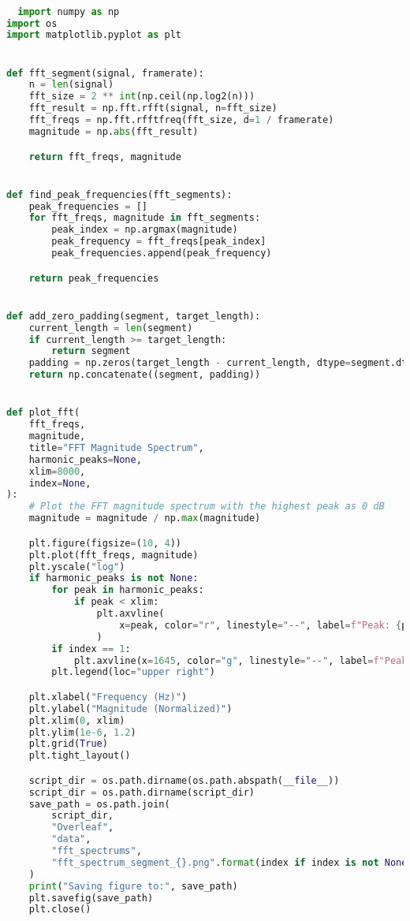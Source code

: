 \begin{lstlisting}[language=Python, caption={fft.py}, label={lst:fft}]

  import numpy as np
import os
import matplotlib.pyplot as plt


def fft_segment(signal, framerate):
    n = len(signal)
    fft_size = 2 ** int(np.ceil(np.log2(n)))
    fft_result = np.fft.rfft(signal, n=fft_size)
    fft_freqs = np.fft.rfftfreq(fft_size, d=1 / framerate)
    magnitude = np.abs(fft_result)

    return fft_freqs, magnitude


def find_peak_frequencies(fft_segments):
    peak_frequencies = []
    for fft_freqs, magnitude in fft_segments:
        peak_index = np.argmax(magnitude)
        peak_frequency = fft_freqs[peak_index]
        peak_frequencies.append(peak_frequency)

    return peak_frequencies


def add_zero_padding(segment, target_length):
    current_length = len(segment)
    if current_length >= target_length:
        return segment
    padding = np.zeros(target_length - current_length, dtype=segment.dtype)
    return np.concatenate((segment, padding))


def plot_fft(
    fft_freqs,
    magnitude,
    title="FFT Magnitude Spectrum",
    harmonic_peaks=None,
    xlim=8000,
    index=None,
):
    # Plot the FFT magnitude spectrum with the highest peak as 0 dB
    magnitude = magnitude / np.max(magnitude)

    plt.figure(figsize=(10, 4))
    plt.plot(fft_freqs, magnitude)
    plt.yscale("log")
    if harmonic_peaks is not None:
        for peak in harmonic_peaks:
            if peak < xlim:
                plt.axvline(
                    x=peak, color="r", linestyle="--", label=f"Peak: {peak:.2f} Hz"
                )
        if index == 1:
            plt.axvline(x=1645, color="g", linestyle="--", label=f"Peak: 1645 Hz")
        plt.legend(loc="upper right")

    plt.xlabel("Frequency (Hz)")
    plt.ylabel("Magnitude (Normalized)")
    plt.xlim(0, xlim)
    plt.ylim(1e-6, 1.2)
    plt.grid(True)
    plt.tight_layout()

    script_dir = os.path.dirname(os.path.abspath(__file__))
    script_dir = os.path.dirname(script_dir)
    save_path = os.path.join(
        script_dir,
        "Overleaf",
        "data",
        "fft_spectrums",
        "fft_spectrum_segment_{}.png".format(index if index is not None else "unknown"),
    )
    print("Saving figure to:", save_path)
    plt.savefig(save_path)
    plt.close()



\end{lstlisting}
